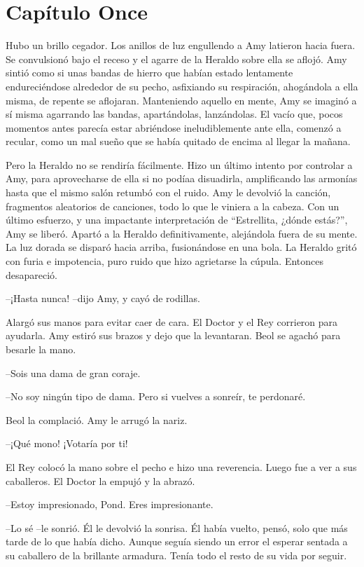 \chapter*{Capítulo Once}

{Hubo un brillo cegador. Los anillos de luz engullendo a Amy latieron
	hacia fuera. Se convulsionó bajo el receso y el agarre de la Heraldo
	sobre ella se aflojó. Amy sintió como si unas bandas de hierro que
	habían estado lentamente endureciéndose alrededor de su pecho,
	asfixiando su respiración, ahogándola a ella misma, de repente se
	aflojaran. Manteniendo aquello en mente, Amy se imaginó a sí misma
	agarrando las bandas, apartándolas, lanzándolas. El vacío que, pocos
	momentos antes parecía estar abriéndose ineludiblemente ante ella,
	comenzó a recular, como un mal sueño que se había quitado de encima al
llegar la mañana.}

{Pero la Heraldo no se rendiría fácilmente. Hizo un último intento por
	controlar a Amy, para aprovecharse de ella si no podíaa disuadirla,
	amplificando las armonías hasta que el mismo salón retumbó con el ruido.
	Amy le devolvió la canción, fragmentos aleatorios de canciones, todo lo
	que le viniera a la cabeza. Con un último esfuerzo, y una impactante
	interpretación de ``Estrellita, ¿dónde estás?'', Amy se liberó. Apartó a
	la Heraldo definitivamente, alejándola fuera de su mente. La luz dorada
	se disparó hacia arriba, fusionándose en una bola. La Heraldo gritó con
	furia e impotencia, puro ruido que hizo agrietarse la cúpula. Entonces
desapareció.}

{--¡Hasta nunca! --dijo Amy, y cayó de rodillas.}

{Alargó sus manos para evitar caer de cara. El Doctor y el Rey corrieron
	para ayudarla. Amy estiró sus brazos y dejo que la levantaran. Beol se
agachó para besarle la mano.}

{--Sois una dama de gran coraje.}

{--No soy ningún tipo de dama. Pero si vuelves a sonreír, te
perdonaré.}

{Beol la complació. Amy le arrugó la nariz.}

{--¡Qué mono! ¡Votaría por ti!}

{El Rey colocó la mano sobre el pecho e hizo una reverencia. Luego fue a
ver a sus caballeros. El Doctor la empujó y la abrazó.}

{--Estoy impresionado, Pond. Eres impresionante.}

{--Lo sé --le sonrió. Él le devolvió la sonrisa. Él había vuelto,
	pensó, solo que más tarde de lo que había dicho. Aunque seguía siendo un
	error el esperar sentada a su caballero de la brillante armadura. Tenía
todo el resto de su vida por seguir.}

